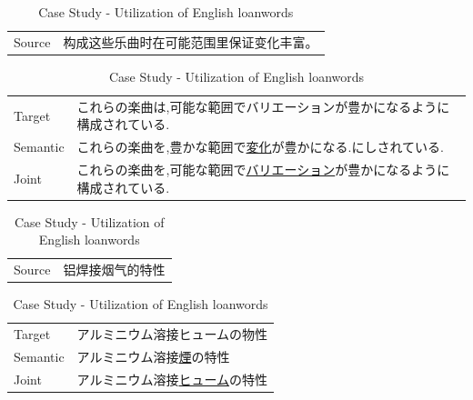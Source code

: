 \vspace{0.4cm}
\begin{table}[h]
    \centering

    \begin{CJK}{UTF8}{gbsn}
        \begin{tabularx}{\textwidth}{p{1.2cm}b}\toprule
            Source & 构成这些乐曲时在可能范围里保证变化丰富。 \\
        \end{tabularx}
    \end{CJK}

    \begin{CJK}{UTF8}{ipxm}
        \begin{tabularx}{\textwidth}{p{1.2cm}b}
            Target & これらの楽曲は,可能な範囲でバリエーションが豊かになるように構成されている. \\
            Semantic & これらの楽曲を,豊かな範囲で\underline{変化}が豊かになる.にしされている. \\
            Joint & これらの楽曲を,可能な範囲で\underline{バリエーション}が豊かになるように構成されている. \\\midrule
        \end{tabularx}
    \end{CJK}

    \begin{CJK}{UTF8}{gbsn}
        \begin{tabularx}{\textwidth}{p{1.2cm}b}
            Source & 铝焊接烟气的特性 \\
        \end{tabularx}
    \end{CJK}

    \begin{CJK}{UTF8}{ipxm}
        \begin{tabularx}{\textwidth}{p{1.2cm}b}
            Target & アルミニウム溶接ヒュームの物性 \\
            Semantic & アルミニウム溶接\underline{煙}の特性 \\
            Joint & アルミニウム溶接\underline{ヒューム}の特性 \\\midrule
        \end{tabularx}
    \end{CJK}
    \caption{Case Study - Utilization of English loanwords}
    \label{tab:case_study2}
\end{table}

